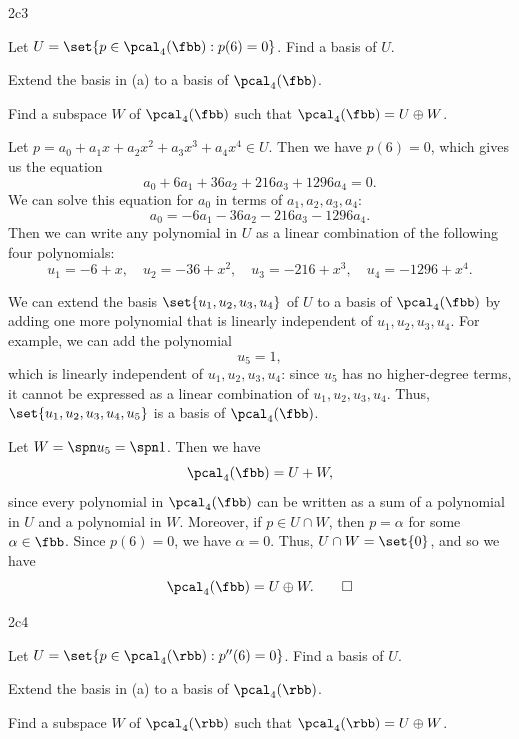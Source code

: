 \begin{exercise}{2c3}
    \begin{subexercises}
        \item Let $U = \set{p \in \pcal_4(\fbb) : p(6) = 0}$.
	Find a basis of $U$.
        \item Extend the basis in (a) to a basis of $\pcal_4(\fbb)$.
        \item Find a subspace $W$ of $\pcal_4(\fbb)$ such that $\pcal_4(\fbb) = U \oplus W$.
    \end{subexercises}
\end{exercise}

\begin{solenum}
    \item Let $p = a_0 + a_1 x + a_2 x^2 + a_3 x^3 + a_4 x^4 \in U$.
	Then we have $p(6) = 0$, which gives us the equation
    \[
    	a_0 + 6a_1 + 36a_2 + 216a_3 + 1296a_4 = 0.
    \]
    We can solve this equation for $a_0$ in terms of $a_1, a_2, a_3, a_4$:
    \[
    	a_0 = -6a_1 - 36a_2 - 216a_3 - 1296a_4.
    \]
    Then we can write any polynomial in $U$ as a linear combination of the following four polynomials:
    \[
    	u_1 = -6 + x, \quad u_2 = -36 + x^2, \quad u_3 = -216 + x^3, \quad u_4 = -1296 + x^4.
    \]
    \item We can extend the basis $\set{u_1, u_2, u_3, u_4}$ of $U$ to a basis of $\pcal_4(\fbb)$ by adding one more polynomial that is linearly independent of $u_1, u_2, u_3, u_4$.
	For example, we can add the polynomial
    \[
    	u_5 = 1,
    \]
    which is linearly independent of $u_1, u_2, u_3, u_4$: since $u_5$ has no higher-degree terms, it cannot be expressed as a linear combination of $u_1, u_2, u_3, u_4$.
	Thus, $\set{u_1, u_2, u_3, u_4, u_5}$ is a basis of $\pcal_4(\fbb)$.
    \item Let $W = \spn u_5 = \spn 1$.
	Then we have
    \[
    	\pcal_4(\fbb) = U + W,
    \]
    since every polynomial in $\pcal_4(\fbb)$ can be written as a sum of a polynomial in $U$ and a polynomial in $W$.
	Moreover, if $p \in U \cap W$, then $p = \alpha$ for some $\alpha \in \fbb$.
	Since $p(6) = 0$, we have $\alpha = 0$.
	Thus, $U \cap W = \set{0}$, and so we have
    \[
    	\pcal_4(\fbb) = U \oplus W. \qedhere
    \]
\end{solenum}

\begin{exercise}{2c4}
    \begin{subexercises}
        \item Let $U = \set{p \in \pcal_4(\rbb) : p''(6) = 0}$.
	Find a basis of $U$.
        \item Extend the basis in (a) to a basis of $\pcal_4(\rbb)$.
        \item Find a subspace $W$ of $\pcal_4(\rbb)$ such that $\pcal_4(\rbb) = U \oplus W$.
    \end{subexercises}
\end{exercise}


